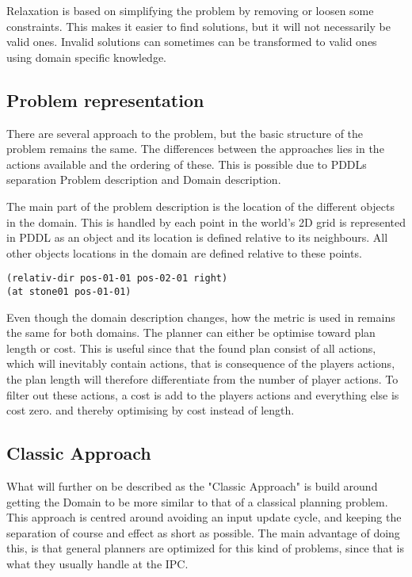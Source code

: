 	Relaxation is based on simplifying the problem by removing or loosen some constraints. This makes it easier to find solutions, but it will not necessarily be valid ones. Invalid solutions can sometimes can be transformed to valid ones using domain specific knowledge.
	
		\subsection{Problem representation}
		There are several approach to the problem, but the basic structure of the problem remains the same. The differences between the approaches lies in the actions available and the ordering of these. This is possible due to PDDLs separation Problem description and Domain description.
		
		The main part of the problem description is the location of the different objects in the domain. This is handled by each point in the world's 2D grid is represented in PDDL as an object and its location is defined relative to its neighbours. All other objects locations in the domain are defined relative to these points.
		\begin{lstlisting}
(relativ-dir pos-01-01 pos-02-01 right)
(at stone01 pos-01-01)
		\end{lstlisting}
		

		
		Even though the domain description changes, how the metric is used in remains the same for both domains. The planner can either be optimise toward plan length or cost. This is useful since that the found plan consist of all actions, which will inevitably contain actions, that is consequence of the players actions, the plan length will therefore differentiate from the number of player actions. To filter out these actions, a cost is add to the players actions and everything else is cost zero. and thereby optimising by cost instead of length.
	
		
		\subsection{Classic Approach}
		What will further on be described as the "Classic Approach" is build around getting the Domain to be more similar to that of a classical planning problem. 
		This approach is centred around avoiding an input update cycle, and keeping the separation of course and effect as short as possible. The main advantage of doing this, is that general planners are optimized for this kind of problems, since that is what they usually handle at the IPC.
		
